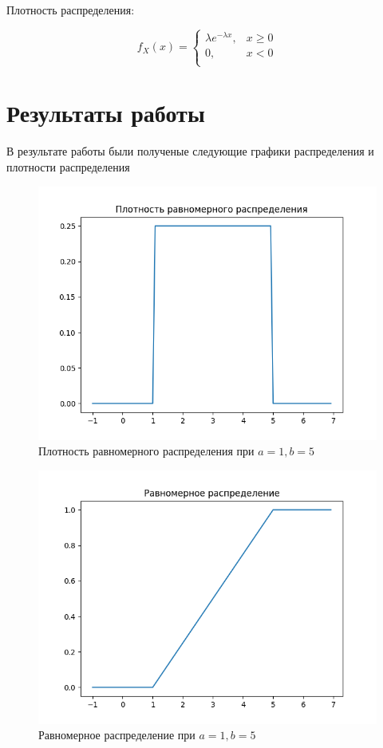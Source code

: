 \documentclass[a4paper, 14pt]{article}
\begin{document}
Плотность распределения:

\begin{equation*}
    f_X (x) =
    \begin{cases}
        \lambda e^{-\lambda x},& x \geq 0 \\
        0, & x < 0 \\
    \end{cases}
\end{equation*}

\section*{Результаты работы}

В результате работы были полученые следующие графики распределения и плотности распределения

\begin{figure}[H]
    \includegraphics[scale=0.8]{1_5_uniform_density.png}
    \caption{Плотность равномерного распределения при $a = 1, b = 5$}
\end{figure}

\begin{figure}[H]
    \includegraphics[scale=0.8]{1_5_uniform.png}
    \caption{Равномерное распределение при $a = 1, b = 5$}
\end{figure}
\end{document}
